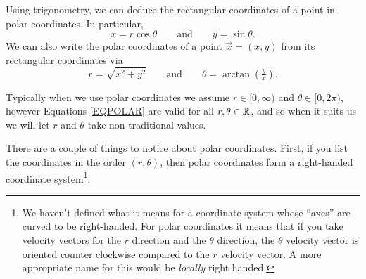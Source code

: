 Using trigonometry, we can deduce the rectangular coordinates of a point in polar coordinates.
In particular,
\begin{equation}
	\label{EQPOLAR}
	x=r\cos\theta\qquad\text{and}\qquad y=\sin\theta.
\end{equation}
We can also write the polar coordinates of a point $\vec x=(x,y)$ from its rectangular coordinates via
\[
	r=\sqrt{x^2+y^2}\qquad\text{and}\qquad \theta=\arctan\left( \tfrac{y}{x}\right).
\]

Typically when we use polar coordinates we assume $r\in[0,\infty)$ and $\theta\in[0,2\pi)$, however
Equations \eqref{EQPOLAR} are valid for all $r,\theta\in\mathbb{R}$, and so when it suits us we will let
$r$ and $\theta$ take non-traditional values.

There are a couple of things to notice about polar coordinates.  First, if you list
the coordinates in the order $(r,\theta)$, then polar coordinates form a right-handed
coordinate system\footnote{ We haven't defined what it means for a coordinate system
whose ``axes'' are curved to be right-handed.  For polar coordinates it means that if
you take velocity vectors for the $r$ direction and the $\theta$ direction, the $\theta$
velocity vector is oriented counter clockwise compared to the $r$ velocity vector.  A more
appropriate name for this would be \emph{locally} right handed.}. 

